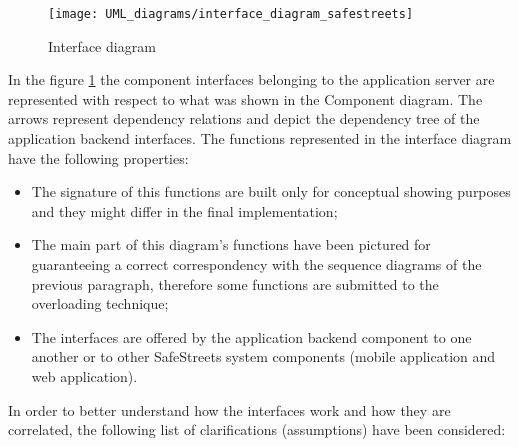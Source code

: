 \begin{figure}[H]
    \centering
    \texttt{[image: UML\_diagrams/interface\_diagram\_safestreets]}
    \caption{Interface diagram}
    \label{fig:interface_diagram}
\end{figure}
In the figure \ref{fig:interface_diagram} the component interfaces belonging to the application server are represented with respect to what was shown in the Component diagram. The arrows represent dependency relations and depict the dependency tree of the application backend interfaces. 
The functions represented in the interface diagram have the following properties:
\begin{itemize}
    \item The signature of this functions are built only for conceptual showing purposes and they might differ in the final implementation;
    \item The main part of this diagram's functions have been pictured for guaranteeing a correct correspondency with the sequence diagrams of the previous paragraph, therefore some functions are submitted to the overloading technique;
    \item The interfaces are offered by the application backend component to one another or to other SafeStreets system components (mobile application and web application).
\end{itemize} 
In order to better understand how the interfaces work and how they are correlated, the following list of clarifications (assumptions) have been considered:
